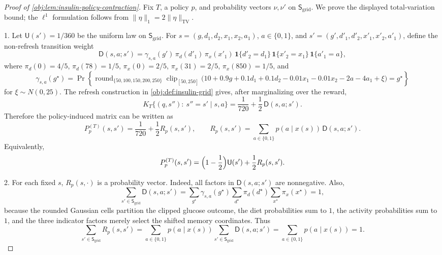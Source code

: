 \documentclass[11pt]{article}
\begin{document}
\begin{proof}[Proof of \cref{obj:lem:insulin-policy-contraction}]
Fix \(T\), a policy \(p\), and probability vectors \(\nu,\nu'\) on
\(\mathsf S_{\mathrm{grid}}\).  We prove the displayed total-variation
bound; the \(\ell^1\) formulation follows from
\(\|\eta\|_1=2\|\eta\|_{\mathrm{TV}}\).

1. Let \(\mathsf U(s')=1/360\) be the uniform law on
\(\mathsf S_{\mathrm{grid}}\).  For
\(s=(g,d_1,d_2,x_1,x_2,a_1)\), \(a\in\{0,1\}\), and
\(s'=(g',d'_1,d'_2,x'_1,x'_2,a'_1)\), define the non-refresh transition
weight
\[
\mathsf D(s,a;s')
=
\gamma_{s,a}(g')\,
\pi_d(d'_1)\,
\pi_x(x'_1)\,
\mathbf 1\{d'_2=d_1\}\,
\mathbf 1\{x'_2=x_1\}\,
\mathbf 1\{a'_1=a\},
\]
where \(\pi_d(0)=4/5\), \(\pi_d(78)=1/5\),
\(\pi_x(0)=2/5\), \(\pi_x(31)=2/5\), \(\pi_x(850)=1/5\), and
\[
\gamma_{s,a}(g^\star)
=
\Pr\!\left\{
\operatorname{round}_{\{50,100,150,200,250\}}
\operatorname{clip}_{[50,250]}
\bigl(
10+0.9g+0.1d_1+0.1d_2-0.01x_1-0.01x_2-2a-4a_1+\xi
\bigr)
=g^\star
\right\}
\]
for \(\xi\sim N(0,25)\).  The refresh construction in
\cref{obj:def:insulin-grid} gives, after marginalizing over the reward,
\[
K_T\{(q,s''):\ s''=s'\mid s,a\}
=
\frac{1}{720}+\frac12\,\mathsf D(s,a;s').
\]
Therefore the policy-induced matrix can be written as
\[
P_p^{(T)}(s,s')
=
\frac{1}{720}
+\frac12 R_p(s,s'),
\qquad
R_p(s,s')
=
\sum_{a\in\{0,1\}}p(a\mid x(s))\,\mathsf D(s,a;s').
\]
Equivalently,
\[
P_p^{(T)}(s,s')
=
\Bigl(1-\frac12\Bigr)\mathsf U(s')
+\frac12 R_p(s,s').
\]

2. For each fixed \(s\), \(R_p(s,\cdot)\) is a probability vector.  Indeed,
all factors in \(\mathsf D(s,a;s')\) are nonnegative.  Also,
\[
\sum_{s'\in\mathsf S_{\mathrm{grid}}}\mathsf D(s,a;s')
=
\sum_{g^\star}\gamma_{s,a}(g^\star)
\sum_{d^\star}\pi_d(d^\star)
\sum_{x^\star}\pi_x(x^\star)
=1,
\]
because the rounded Gaussian cells partition the clipped glucose outcome,
the diet probabilities sum to \(1\), the activity probabilities sum to \(1\),
and the three indicator factors merely select the shifted memory coordinates.
Thus
\[
\sum_{s'\in\mathsf S_{\mathrm{grid}}} R_p(s,s')
=
\sum_{a\in\{0,1\}}p(a\mid x(s))
\sum_{s'\in\mathsf S_{\mathrm{grid}}}\mathsf D(s,a;s')
=
\sum_{a\in\{0,1\}}p(a\mid x(s))
=1.
\]


\end{proof}
\end{document}
